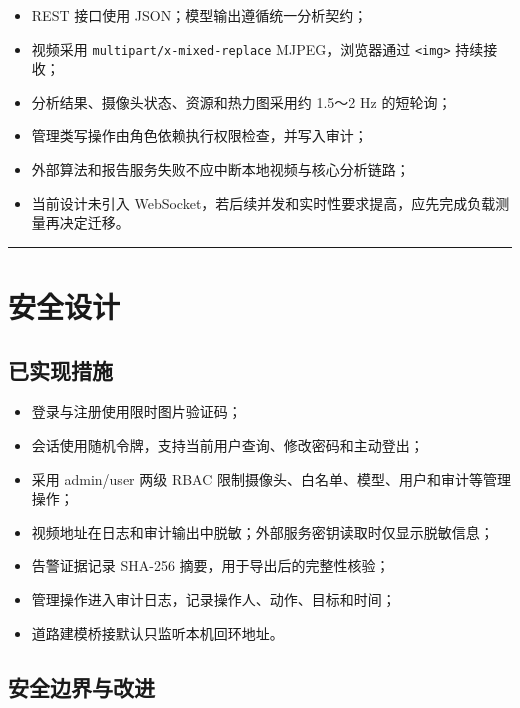 \begin{itemize}
\tightlist
\item
  REST 接口使用 JSON；模型输出遵循统一分析契约；
\item
  视频采用 \texttt{multipart/\allowbreak{}x-\allowbreak{}mixed-\allowbreak{}replace} MJPEG，浏览器通过 \texttt{<img>} 持续接收；
\item
  分析结果、摄像头状态、资源和热力图采用约 1.5～2 Hz 的短轮询；
\item
  管理类写操作由角色依赖执行权限检查，并写入审计；
\item
  外部算法和报告服务失败不应中断本地视频与核心分析链路；
\item
  当前设计未引入 WebSocket，若后续并发和实时性要求提高，应先完成负载测量再决定迁移。
\end{itemize}

\begin{center}\rule{0.5\linewidth}{0.5pt}\end{center}

\section{安全设计}\label{design-ux5b89ux5168ux8bbeux8ba1}

\subsection{已实现措施}\label{design-ux5df2ux5b9eux73b0ux63aaux65bd}

\begin{itemize}
\tightlist
\item
  登录与注册使用限时图片验证码；
\item
  会话使用随机令牌，支持当前用户查询、修改密码和主动登出；
\item
  采用 admin/user 两级 RBAC 限制摄像头、白名单、模型、用户和审计等管理操作；
\item
  视频地址在日志和审计输出中脱敏；外部服务密钥读取时仅显示脱敏信息；
\item
  告警证据记录 SHA-256 摘要，用于导出后的完整性核验；
\item
  管理操作进入审计日志，记录操作人、动作、目标和时间；
\item
  道路建模桥接默认只监听本机回环地址。
\end{itemize}

\subsection{安全边界与改进}\label{design-ux5b89ux5168ux8fb9ux754cux4e0eux6539ux8fdb}

